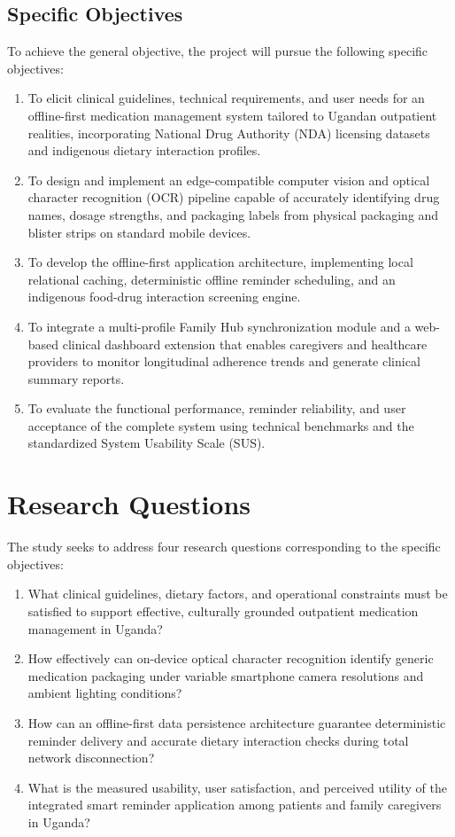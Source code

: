 \subsection{Specific Objectives}

To achieve the general objective, the project will pursue the following specific objectives:
\begin{enumerate}[label=(\roman*),noitemsep,topsep=2pt]
  \item To elicit clinical guidelines, technical requirements, and user needs for an offline-first medication management system tailored to Ugandan outpatient realities, incorporating National Drug Authority (NDA) licensing datasets and indigenous dietary interaction profiles.
  \item To design and implement an edge-compatible computer vision and optical character recognition (OCR) pipeline capable of accurately identifying drug names, dosage strengths, and packaging labels from physical packaging and blister strips on standard mobile devices.
  \item To develop the offline-first application architecture, implementing local relational caching, deterministic offline reminder scheduling, and an indigenous food-drug interaction screening engine.
  \item To integrate a multi-profile Family Hub synchronization module and a web-based clinical dashboard extension that enables caregivers and healthcare providers to monitor longitudinal adherence trends and generate clinical summary reports.
  \item To evaluate the functional performance, reminder reliability, and user acceptance of the complete system using technical benchmarks and the standardized System Usability Scale (SUS).
\end{enumerate}

\section{Research Questions}

The study seeks to address four research questions corresponding to the specific objectives:
\begin{enumerate}[label=RQ\arabic*:,noitemsep,topsep=2pt]
  \item What clinical guidelines, dietary factors, and operational constraints must be satisfied to support effective, culturally grounded outpatient medication management in Uganda?
  \item How effectively can on-device optical character recognition identify generic medication packaging under variable smartphone camera resolutions and ambient lighting conditions?
  \item How can an offline-first data persistence architecture guarantee deterministic reminder delivery and accurate dietary interaction checks during total network disconnection?
  \item What is the measured usability, user satisfaction, and perceived utility of the integrated smart reminder application among patients and family caregivers in Uganda?
\end{enumerate}

